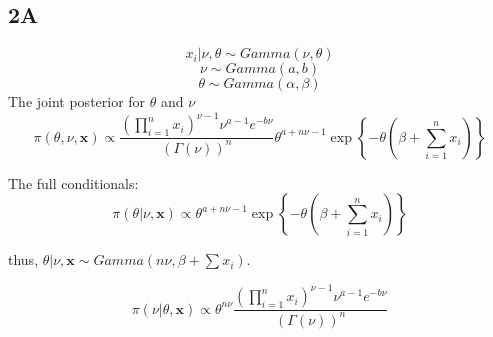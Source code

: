 \documentclass[]{article}
\begin{document}
\subsection{2A}\label{a-1}

\[x_i |\nu,\theta \sim Gamma(\nu,\theta)\] \[\nu \sim Gamma(a,b)\]
\[\theta \sim Gamma(\alpha,\beta)\] The joint posterior for \(\theta\)
and \(\nu\)
\[\pi(\theta,\nu,\pmb{x}) \propto  \frac{\left(\prod_{i=1}^nx_i \right)^{\nu-1}\nu^{a-1} e^{-b\nu}}{\left(\Gamma(\nu) \right)^n} \theta^{a+n\nu-1} \exp\left\{-\theta\left(\beta + \sum_{i=1}^n x_i \right) \right\}\]

The full conditionals:
\[\pi(\theta|\nu, \pmb{x}) \propto \theta^{a+n\nu-1}\exp\left\{-\theta\left(\beta + \sum_{i=1}^n x_i \right) \right\}\]

thus, \(\theta|\nu, \pmb{x} \sim Gamma(n\nu, \beta + \sum x_i)\).

\[\pi(\nu|\theta,\pmb{x}) \propto \theta^{n\nu}\frac{\left(\prod_{i=1}^nx_i \right)^{\nu-1}\nu^{a-1} e^{-b\nu}}{\left(\Gamma(\nu) \right)^n}\]
\end{document}
